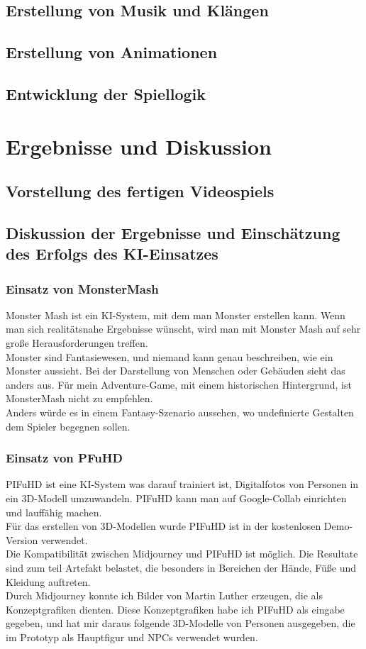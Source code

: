 \documentclass[10pt,a4paper,bibliography=totocnumbered,listof=totocnumbered]{scrartcl}
\begin{document}
\subsection{Erstellung von Musik und Klängen}
\subsection{Erstellung von Animationen}
\subsection{Entwicklung der Spiellogik}
\section{Ergebnisse und Diskussion}
\subsection{Vorstellung des fertigen Videospiels}
 
\subsection{Diskussion der Ergebnisse und Einschätzung des Erfolgs des KI-Einsatzes}
\subsubsection{Einsatz von MonsterMash}
Monster Mash ist ein KI-System, mit dem man Monster erstellen kann. Wenn man sich realitätsnahe Ergebnisse wünscht, wird man mit Monster Mash auf sehr große Herausforderungen treffen.
\\
Monster sind Fantasiewesen, und niemand kann genau beschreiben, wie ein Monster aussieht. Bei der Darstellung von Menschen oder Gebäuden sieht das anders aus. Für mein Adventure-Game, mit einem historischen Hintergrund, ist MonsterMash nicht zu empfehlen.
\\
Anders würde es in einem Fantasy-Szenario aussehen, wo undefinierte Gestalten dem Spieler begegnen sollen.
\subsubsection{Einsatz von PFuHD}
PIFuHD ist eine KI-System was darauf trainiert ist, Digitalfotos von Personen in ein 3D-Modell umzuwandeln. PIFuHD kann man auf Google-Collab einrichten und lauffähig machen.
\\
Für das erstellen von 3D-Modellen wurde PIFuHD ist in der kostenlosen Demo-Version verwendet.
\\
Die Kompatibilität zwischen Midjourney und PIFuHD ist möglich. Die Resultate sind zum teil Artefakt belastet, die besonders in Bereichen der Hände, Füße und Kleidung auftreten.
\\
Durch Midjourney konnte ich Bilder von Martin Luther erzeugen, die als Konzeptgrafiken dienten. Diese Konzeptgrafiken habe ich PIFuHD als eingabe gegeben, und hat mir daraus folgende 3D-Modelle von Personen ausgegeben, die im Prototyp als Hauptfigur und NPCs verwendet wurden.
\end{document}
